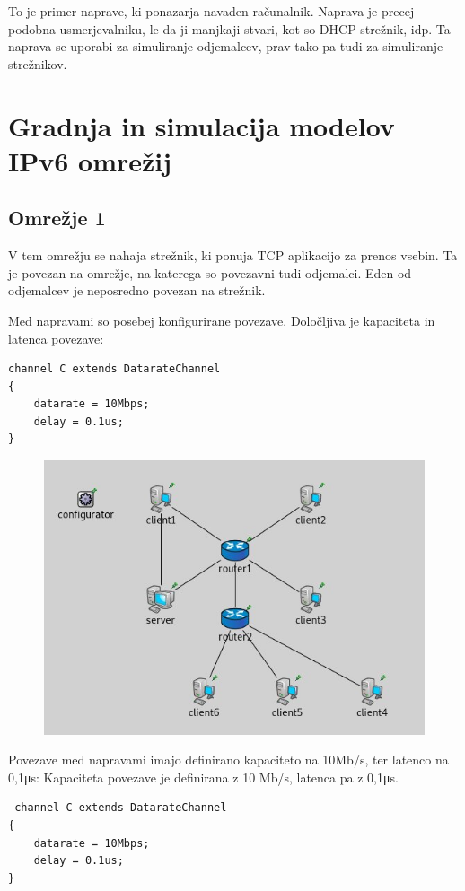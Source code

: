 \documentclass[11pt,a4paper,slovene]{myarticle}
\begin{document}
To je primer naprave, ki ponazarja navaden računalnik. Naprava je precej podobna usmerjevalniku, le da ji manjkaji stvari, kot so DHCP strežnik, idp.
Ta naprava se uporabi za simuliranje odjemalcev, prav tako pa tudi za simuliranje strežnikov.


\section{Gradnja in simulacija modelov IPv6 omrežij}

\subsection{Omrežje 1}
V tem omrežju se nahaja strežnik, ki ponuja TCP aplikacijo za prenos vsebin. Ta je povezan na omrežje,
na katerega so povezavni tudi odjemalci. Eden od odjemalcev je neposredno povezan na strežnik.

Med napravami so posebej konfigurirane povezave. Določljiva je kapaciteta in latenca povezave:
\begin{lstlisting}
channel C extends DatarateChannel
{
    datarate = 10Mbps;
    delay = 0.1us;
}
\end{lstlisting}


\begin{figure}[h]
  \includegraphics[width=\linewidth]{omrezje1.jpg}
\end{figure}

Povezave med napravami imajo definirano kapaciteto na 10Mb/s, ter latenco na 0,1μs:
Kapaciteta povezave je definirana z 10 Mb/s, latenca pa z 0,1μs.
\begin{lstlisting}
 channel C extends DatarateChannel
{
    datarate = 10Mbps;
    delay = 0.1us;
}
\end{lstlisting}
\end{document}
